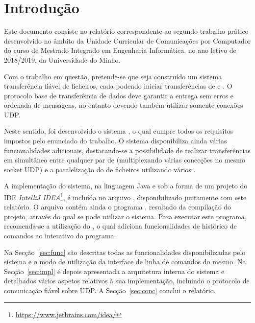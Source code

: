
\section{Introdução}

Este documento consiste no relatório correspondente ao segundo trabalho prático desenvolvido no âmbito da Unidade Curricular de Comunicações por Computador do curso de Mestrado Integrado em Engenharia Informática, no ano letivo de 2018/2019, da Universidade do Minho.

Com o trabalho em questão, pretende-se que seja construído um sistema  transferência fiável de ficheiros, cada  podendo iniciar transferências de  e . O protocolo base de transferência de dados deve garantir a entrega sem erros e ordenada de mensagens, no entanto devendo também utilizar somente conexões UDP.

Neste sentido, foi desenvolvido o sistema \SYS, o qual cumpre todos os requisitos impostos pelo enunciado do trabalho. O sistema disponibiliza ainda várias funcionalidades adicionais, destacando-se  a possibilidade de realizar transferências em simultâneo entre qualquer par de  (multiplexando várias conecções no mesmo socket UDP) e  a paralelização do  de ficheiros utilizando vários .


A implementação do sistema, na linguagem Java e sob a forma de um projeto do IDE \emph{IntelliJ IDEA}\footnote{\url{https://www.jetbrains.com/idea/}}, é incluída no arquivo \ARQUIVO, disponibilizado juntamente com este relatório. O arquivo contém ainda o programa , resultado da compilação do projeto, através do qual se pode utilizar o sistema. Para executar este programa, recomenda-se a utilização do  , o qual adiciona funcionalidades de histórico de comandos ao  interativo do programa.


Na Secção~\ref{sec:func} são descritas todas as funcionalidades disponibilizadas pelo sistema e o modo de utilização da interface de linha de comandos do mesmo. Na Secção~\ref{sec:impl} é depois apresentada a arquitetura interna do sistema e detalhados vários aspetos relativos à sua implementação, incluindo o protocolo de comunicação fiável sobre UDP. A Secção~\ref{sec:conc} conclui o relatório.


